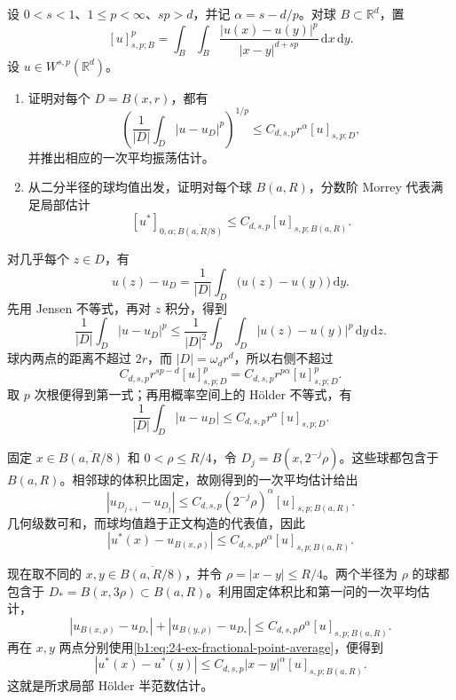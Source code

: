 \begin{exercise}\label{b1:ex:24-fractional-morrey-local}
设 \(0<s<1\)、\(1\le p<\infty\)、\(sp>d\)，并记
\(\alpha=s-d/p\)。对球 \(B\subset\mathbb R^d\)，置
\[
 [u]_{s,p;B}^p
 =\int_B\int_B
   \frac{|u(x)-u(y)|^p}{|x-y|^{d+sp}}\,\mathrm dx\,\mathrm dy.
\]
设 \(u\in W^{s,p}(\mathbb R^d)\)。
\begin{enumerate}
 \item\label{b1:item:24-fractional-average-oscillation}
 证明对每个 \(D=B(x,r)\)，都有
 \[
  \left(\frac1{|D|}\int_D|u-u_D|^p\right)^{1/p}
       \le C_{d,s,p}r^\alpha[u]_{s,p;D},
 \]
 并推出相应的一次平均振荡估计。
 \item\label{b1:item:24-fractional-local-holder}
 从二分半径的球均值出发，证明对每个球 \(B(a,R)\)，分数阶 Morrey 代表满足局部估计
 \[
  [u^*]_{0,\alpha;\overline{B(a,R/8)}}
       \le C_{d,s,p}[u]_{s,p;B(a,R)}.
 \]
\end{enumerate}
\end{exercise}
\begin{solution}
对几乎每个 \(z\in D\)，有
\[
 u(z)-u_D=\frac1{|D|}\int_D\bigl(u(z)-u(y)\bigr)\,\mathrm dy.
\]
先用 Jensen 不等式，再对 \(z\) 积分，得到
\[
 \frac1{|D|}\int_D|u-u_D|^p
 \le\frac1{|D|^2}\int_D\int_D|u(z)-u(y)|^p\,\mathrm dy\,\mathrm dz.
\]
球内两点的距离不超过 \(2r\)，而 \(|D|=\omega_dr^d\)，所以右侧不超过
\[
 C_{d,s,p}r^{sp-d}[u]_{s,p;D}^p
   =C_{d,s,p}r^{p\alpha}[u]_{s,p;D}^p.
\]
取 \(p\) 次根便得到第一式；再用概率空间上的 Hölder 不等式，有
\[
 \frac1{|D|}\int_D|u-u_D|
       \le C_{d,s,p}r^\alpha[u]_{s,p;D}.
\]

固定 \(x\in\overline{B(a,R/8)}\) 和 \(0<\rho\le R/4\)，令
\(D_j=B(x,2^{-j}\rho)\)。这些球都包含于 \(B(a,R)\)。相邻球的体积比固定，故刚得到的一次平均估计给出
\[
 |u_{D_{j+1}}-u_{D_j}|
 \le C_{d,s,p}(2^{-j}\rho)^\alpha
             [u]_{s,p;B(a,R)}.
\]
几何级数可和，而球均值趋于正文构造的代表值，因此
\begin{equation}\label{b1:eq:24-ex-fractional-point-average}
 |u^*(x)-u_{B(x,\rho)}|
 \le C_{d,s,p}\rho^\alpha[u]_{s,p;B(a,R)}.
\end{equation}

现在取不同的 \(x,y\in\overline{B(a,R/8)}\)，并令
\(\rho=|x-y|\le R/4\)。两个半径为 \(\rho\) 的球都包含于
\(D_*=B(x,3\rho)\subset B(a,R)\)。利用固定体积比和第一问的一次平均估计，
\[
 |u_{B(x,\rho)}-u_{D_*}|
 +|u_{B(y,\rho)}-u_{D_*}|
 \le C_{d,s,p}\rho^\alpha[u]_{s,p;B(a,R)}.
\]
再在 \(x,y\) 两点分别使用\eqref{b1:eq:24-ex-fractional-point-average}，便得到
\[
 |u^*(x)-u^*(y)|
 \le C_{d,s,p}|x-y|^\alpha[u]_{s,p;B(a,R)}.
\]
这就是所求局部 Hölder 半范数估计。
\end{solution}

